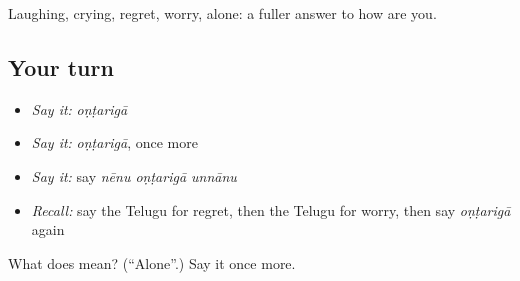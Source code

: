 \begin{grammarlens}[title={What you've built}]
Laughing, crying, regret, worry, alone: a fuller answer to how are you.
\end{grammarlens}

\subsection*{Your turn}
\begin{itemize}
\raggedright
  \item \emph{Say it:} \emph{oṇṭarigā}
  \item \emph{Say it:} \emph{oṇṭarigā}, once more
  \item \emph{Say it:} say \emph{nēnu oṇṭarigā unnānu}
  \item \emph{Recall:} say the Telugu for regret, then the Telugu for worry, then say \emph{oṇṭarigā} again
\end{itemize}

\begin{tcolorbox}[breakable,colback=teal!4,colframe=teal!35!black,title={Before you move on}]
What does  mean? (\textquotedblleft{}Alone\textquotedblright{}.) Say it once more.
\end{tcolorbox}
